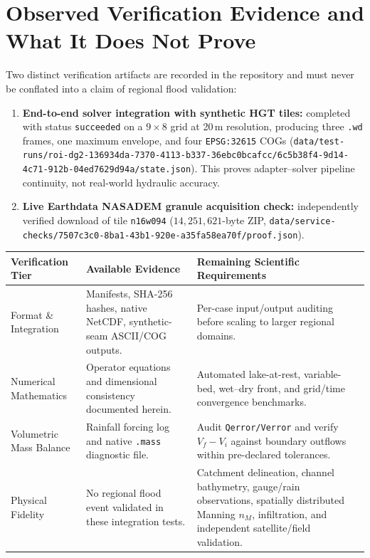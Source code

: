 \documentclass[11pt,a4paper]{article}
\newcommand{\src}[1]{\nolinkurl{#1}}
\begin{document}
\section{Observed Verification Evidence and What It Does Not Prove}
\label{sec:evidencia}
Two distinct verification artifacts are recorded in the repository and must never be conflated into a claim of regional flood validation:
\begin{enumerate}
\item \textbf{End-to-end solver integration with synthetic HGT tiles:} completed with status \texttt{succeeded} on a $9\times8$ grid at 20\,m resolution, producing three \texttt{.wd} frames, one maximum envelope, and four \texttt{EPSG:32615} COGs (\src{data/test-runs/roi-dg2-136934da-7370-4113-b337-36ebc0bcafcc/6c5b38f4-9d14-4c71-912b-04ed7629d94a/state.json}). This proves adapter--solver pipeline continuity, not real-world hydraulic accuracy.
\item \textbf{Live Earthdata NASADEM granule acquisition check:} independently verified download of tile \texttt{n16w094} ($14,251,621$-byte ZIP, \src{data/service-checks/7507c3c0-8ba1-43b1-920e-a35fa58ea70f/proof.json}).
\end{enumerate}
\begin{tabularx}{\linewidth}{p{.23\linewidth}p{.37\linewidth}X}
\toprule Verification Tier & Available Evidence & Remaining Scientific Requirements\\\midrule
Format \& Integration & Manifests, SHA-256 hashes, native NetCDF, synthetic-seam ASCII/COG outputs. & Per-case input/output auditing before scaling to larger regional domains.\\
Numerical Mathematics & Operator equations and dimensional consistency documented herein. & Automated lake-at-rest, variable-bed, wet--dry front, and grid/time convergence benchmarks.\\
Volumetric Mass Balance & Rainfall forcing log and native \texttt{.mass} diagnostic file. & Audit \texttt{Qerror/Verror} and verify $V_f-V_i$ against boundary outflows within pre-declared tolerances.\\
Physical Fidelity & No regional flood event validated in these integration tests. & Catchment delineation, channel bathymetry, gauge/rain observations, spatially distributed Manning $n_M$, infiltration, and independent satellite/field validation.\\\bottomrule
\end{tabularx}
\end{document}

